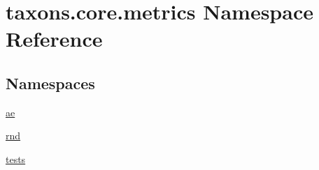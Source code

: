 \hypertarget{namespacetaxons_1_1core_1_1metrics}{}\section{taxons.\+core.\+metrics Namespace Reference}
\label{namespacetaxons_1_1core_1_1metrics}
\subsection*{Namespaces}
\begin{DoxyCompactItemize}
\item 
 \hyperlink{namespacetaxons_1_1core_1_1metrics_1_1ae}{ae}
\item 
 \hyperlink{namespacetaxons_1_1core_1_1metrics_1_1rnd}{rnd}
\item 
 \hyperlink{namespacetaxons_1_1core_1_1metrics_1_1tests}{tests}
\end{DoxyCompactItemize}
